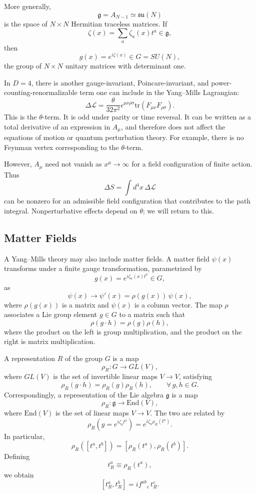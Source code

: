 More generally,
\[
  \mathfrak g=A_{N-1}\simeq\mathfrak{su}(N)
\]
is the space of \(N\times N\) Hermitian traceless matrices.  If
\[
  \zeta(x)=\sum_a\zeta_a(x)t^a\in\mathfrak g,
\]
then
\[
  g(x)=e^{i\zeta(x)}\in G=SU(N),
\]
the group of \(N\times N\) unitary matrices with determinant one.

In \(D=4\), there is another gauge-invariant, Poincare-invariant, and
power-counting-renormalizable term one can include in the Yang--Mills
Lagrangian:
\[
  \Delta\mathcal L
  =
  \frac{\theta}{32\pi^2}
  \epsilon^{\mu\nu\rho\sigma}
  \mathrm{tr}(F_{\mu\nu}F_{\rho\sigma}).
\]
This is the \(\theta\)-term.  It is odd under parity or time reversal.  It
can be written as a total derivative of an expression in \(A_\mu\), and
therefore does not affect the equations of motion or quantum perturbation
theory.  For example, there is no Feynman vertex corresponding to the
\(\theta\)-term.

However, \(A_\mu\) need not vanish as \(x^\mu\to\infty\) for a field
configuration of finite action.  Thus
\[
  \Delta S=\int d^4x\,\Delta\mathcal L
\]
can be nonzero for an admissible field configuration that contributes to
the path integral.  Nonperturbative effects depend on \(\theta\); we will
return to this.


\subsection{Matter Fields}

A Yang--Mills theory may also include matter fields.  A matter field
\(\psi(x)\) transforms under a finite gauge transformation, parametrized
by
\[
  g(x)=e^{i\zeta_a(x)t^a}\in G,
\]
as
\[
  \psi(x)\longrightarrow
  \psi'(x)=\rho(g(x))\,\psi(x),
\]
where \(\rho(g(x))\) is a matrix and \(\psi(x)\) is a column vector.  The
map \(\rho\) associates a Lie group element \(g\in G\) to a matrix such
that
\[
  \rho(g\cdot h)=\rho(g)\rho(h),
\]
where the product on the left is group multiplication, and the product on
the right is matrix multiplication.

A representation \(R\) of the group \(G\) is a map
\[
  \rho_R:G\longrightarrow GL(V),
\]
where \(GL(V)\) is the set of invertible linear maps \(V\to V\), satisfying
\[
  \rho_R(g\cdot h)=\rho_R(g)\rho_R(h),
  \qquad \forall\,g,h\in G .
\]
Correspondingly, a representation of the Lie algebra \(\mathfrak g\) is a
map
\[
  \rho_R:\mathfrak g\longrightarrow \mathrm{End}(V),
\]
where \(\mathrm{End}(V)\) is the set of linear maps \(V\to V\).  The two
are related by
\[
  \rho_R(g=e^{i\zeta_a t^a})
  =
  e^{i\zeta_a\rho_R(t^a)}.
\]
In particular,
\[
  \rho_R([t^a,t^b])
  =
  [\rho_R(t^a),\rho_R(t^b)].
\]
Defining
\[
  t_R^a\equiv \rho_R(t^a),
\]
we obtain
\[
  [t_R^a,t_R^b]=i f^{ab}{}_{c}\,t_R^c .
\]


